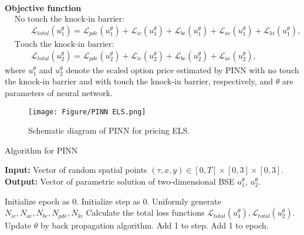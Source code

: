 \documentclass[11pt,reqno]{article}
\numberwithin{equation}{section}
\begin{document}
{\noindent \textbf{Objective function}
%
\begin{equation*}
\begin{aligned}
    & \text{No touch the knock-in barrier:} \\
    &\qquad \mathcal{L}_{total} (u_1^{\theta})
    = \mathcal{L}_{pde} (u_1^{\theta})
    + \mathcal{L}_{ic} (u_1^{\theta})
    + \mathcal{L}_{bc} (u_1^{\theta})
    + \mathcal{L}_{ac} (u_1^{\theta})
    + \mathcal{L}_{ki} (u_1^{\theta}), \\
    & \text{Touch the knock-in barrier:} \\
    &\qquad \mathcal{L}_{total} (u_2^{\theta})
    = \mathcal{L}_{pde} (u_2^{\theta})
    + \mathcal{L}_{ic} (u_2^{\theta})
    + \mathcal{L}_{bc} (u_2^{\theta})
    + \mathcal{L}_{ac} (u_2^{\theta}),
\end{aligned}
\end{equation*}
where $u_1^{\theta}$ and  $u_2^{\theta}$ denote the scaled option price estimated
 by PINN with no touch the knock-in barrier and
 with touch the knock-in barrier, respectively,
  and $\theta$ are parameters of neural network. 

\begin{figure}[H]
    \centerline{\texttt{[image: Figure/PINN ELS.png]}}
    \caption{Schematic diagram of PINN for pricing ELS.}  
    \label{fig:Schematic diagram}
\end{figure}

\begin{algorithm}[H]\small
\caption{Algorithm for PINN}\label{algo:3}
    \textbf{Input:}
    Vector of random spatial points $(\tau, x, y) \in [0, T] \times [0, 3] \times [0, 3]$. \\
    \textbf{Output:}
    Vector of parametric solution of two-dimensional BSE $u_1^{\theta}$, $u_2^{\theta}$.
\begin{algorithmic}
    \State Initialize epoch as 0.
        \State Initialize step as 0.
        \State Uniformly generate $N_{ic}, N_{ac}, N_{bc}, N_{pde}, N_{ki}$
            \State Calculate the total loss functions $\mathcal{L}_{total}(u_1^{\theta}), \mathcal{L}_{total}(u_2^{\theta})$. 
            \State Update $\theta$ by back propagation algorithm.
            \State Add 1 to step.
        \EndWhile
        \State Add 1 to epoch.
    \EndWhile
\end{algorithmic}
\end{algorithm}

}
\end{document}
